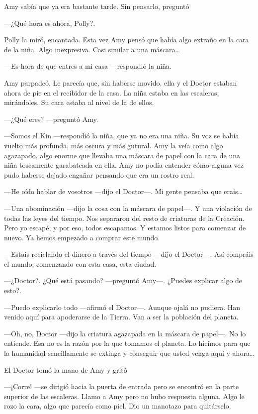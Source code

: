 Amy sabía que ya era bastante tarde. Sin pensarlo, preguntó

---¿Qué hora es ahora, Polly?.

Polly la miró, encantada. Esta vez Amy pensó que había algo extraño en la cara de la niña. Algo inexpresiva. Casi similar a una máscara\ldots{}

---Es hora de que entres a mi casa ---respondió la niña.

Amy parpadeó. Le parecía que, sin haberse movido, ella y el Doctor estaban ahora de pie en el recibidor de la casa. La niña estaba en las escaleras, mirándoles. Su cara estaba al nivel de la de ellos.

---¿Qué eres? ---preguntó Amy.

---Somos el Kin ---respondió la niña, que ya no era una niña. Su voz se había vuelto más profunda, más oscura y más gutural. Amy la veía como algo agazapado, algo enorme que llevaba una máscara de papel con la cara de una niña toscamente garabateada en ella. Amy no podía entender cómo alguna vez pudo haberse dejado engañar pensando que era un rostro real.

---He oído hablar de vosotros ---dijo el Doctor---. Mi gente pensaba que erais\ldots{}

---Una abominación ---dijo la cosa con la máscara de papel---. Y una violación de todas las leyes del tiempo. Nos separaron del resto de criaturas de la Creación. Pero yo escapé, y por eso, todos escapamos. Y estamos listos para comenzar de nuevo. Ya hemos empezado a comprar este mundo.

---Estais reciclando el dinero a través del tiempo ---dijo el Doctor---. Así compráis el mundo, comenzando con esta casa, esta ciudad.

---¿Doctor?. ¿Qué está pasando? ---preguntó Amy---. ¿Puedes explicar algo de esto?.

---Puedo explicarlo todo ---afirmó el Doctor---. Aunque ojalá no pudiera. Han venido aquí para apoderarse de la Tierra. Van a ser la población del planeta.

---Oh, no, Doctor ---dijo la criatura agazapada en la máscara de papel---. No lo entiende. Esa no es la razón por la que tomamos el planeta. Lo hicimos para que la humanidad sencillamente se extinga y conseguir que usted venga aquí y ahora\ldots{}

El Doctor tomó la mano de Amy y gritó

---¡Corre! ---se dirigió hacia la puerta de entrada pero se encontró en la parte superior de las escaleras. Llamo a Amy pero no hubo respuesta alguna. Algo le rozo la cara, algo que parecía como piel. Dio un manotazo para quitárselo.

